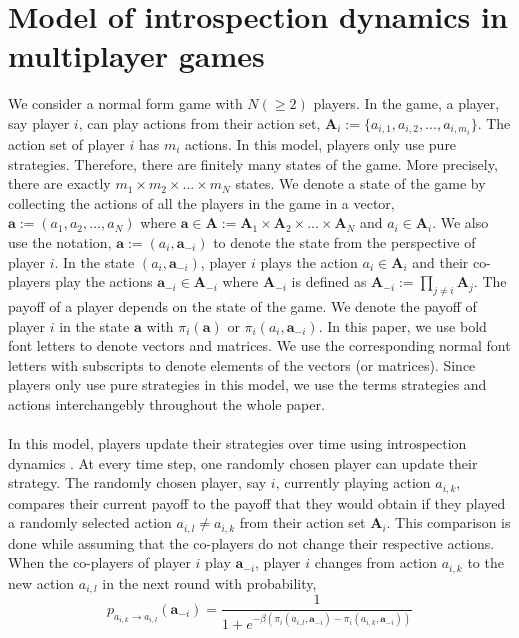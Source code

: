\documentclass[11pt]{article}
\theoremstyle{plainCl1}
\theoremstyle{plainCl2}
\newcommand{\A}{\mathbf{A}}
\newcommand{\abf}{\mathbf{a}}
\begin{document}
\section{Model of introspection dynamics in multiplayer games}
We consider a normal form game with $N (\geq 2)$ players. In the game, a player, say player $i$, can play actions from their action set, $\A_i := \{a_{i,1}, a_{i,2}, ..., a_{i,m_i} \}$. The action set of player $i$ has $m_i$ actions. In this model, players only use pure strategies. Therefore, there are finitely many states of the game. More precisely, there are exactly $m_1 \times m_2 \times ... \times m_N$ states. We denote a state of the game by collecting the actions of all the players in the game in a vector, $\abf := (a_1, a_2, ..., a_N)$ where $\abf \in \A := \A_1 \times \A_2 \times ... \times \A_N$ and $a_i \in \A_i$. We also use the notation, $\abf := (a_i, \abf_{-i})$ to denote the state from the perspective of player $i$. In the state $(a_i, \abf_{-i})$, player $i$ plays the action $a_i \in \A_i$ and their co-players play the actions $\abf_{-i} \in \A_{-i}$ where $\A_{-i}$ is defined as $\A_{-i}:= \prod_{j \neq i} \A_j$. The payoff of a player depends on the state of the game. We denote the payoff of player $i$ in the state $\abf$ with $\pi_i(\abf)$ or $\pi_i(a_i, \abf_{-i})$. In this paper, we use bold font letters to denote vectors and matrices. We use the corresponding normal font letters with subscripts to denote elements of the vectors (or matrices). Since players only use pure strategies in this model, we use the terms strategies and actions interchangebly throughout the whole paper. \\ \\ 
\noindent In this model, players update their strategies over time using introspection dynamics \cite{Couto:NJP:2022}. At every time step, one randomly chosen player can update their strategy. The randomly chosen player, say $i$, currently playing  action $a_{i,k}$, compares their current payoff to the payoff that they would obtain if they played a randomly selected action $a_{i,l} \neq a_{i,k}$ from their action set $\A_i$. This comparison is done while assuming that the co-players do not change their respective actions. When the co-players of player $i$ play $\abf_{-i}$, player $i$ changes from action $a_{i,k}$ to the new action $a_{i,l}$ in the next round with probability, \\
\begin{equation}
 p_{a_{i,k} \to a_{i,l}} (\abf_{-i})= \frac{1}{1 + e^{\displaystyle -\beta(\pi_i(a_{i,l}, \abf_{-i}) - \pi_i(a_{i,k}, \abf_{-i}))}}
 \label{Eq:introspection-update}
\end{equation}
\end{document}
